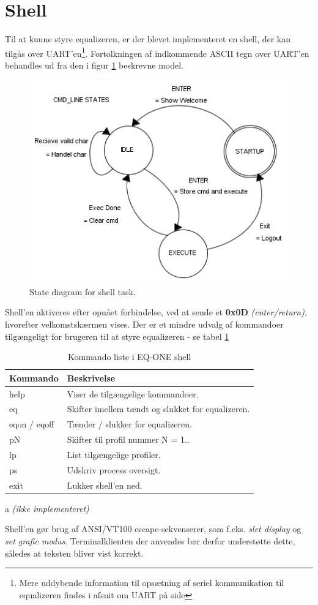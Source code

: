\section{Shell}
Til at kunne styre equalizeren, er der blevet implementeret en shell, der kan tilgås over UART'en\footnote{Mere uddybende information til opsætning af seriel kommunikation til equalizeren findes i afsnit om UART på side \pageref{subsec:uart}}.
Fortolkningen af indkommende ASCII tegn over UART'en behandles ud fra den i figur \ref{fig:shell_task} beskrevne model.
\begin{figure}[h!]
	\centering
	\includegraphics[width=.6\textwidth]{billeder/cmd_states.png}
	\caption{State diagram for shell task.}
	\label{fig:shell_task}
\end{figure}

Shell'en aktiveres efter opnået forbindelse, ved at sende et \textbf{0x0D} \textit{(enter/return)}, hvorefter velkomstskærmen vises.
Der er et mindre udvalg af kommandoer tilgængeligt for brugeren til at styre equalizeren - se tabel \ref{tab:shell_cmd} 

\begin{table}[h!]
	\caption{Kommando liste i EQ-ONE shell}
	\label{tab:shell_cmd}
	\begin{threeparttable}
		\begin{tabular}{l p{}}
			\toprule
			\textbf{Kommando}      & \textbf{Beskrivelse}   \\ 
			\midrule
			help		& Viser de tilgængelige kommandoer. \\
			eq       	& Skifter imellem tændt og slukket for equalizeren. \\
			eqon / eqoff & Tænder / slukker for equalizeren. \tnote{a}\\
			pN			& Skifter til profil nummer N = 1.. \\
			lp			& List tilgængelige profiler.\tnote{a}\\
			ps		    & Udskriv process oversigt. \\
			exit 		& Lukker shell'en ned. \\
			\bottomrule
		\end{tabular}
		
		\begin{tablenotes}
			\item[a] \textit{(ikke implementeret)}
		\end{tablenotes}
	\end{threeparttable}
\end{table}

Shell'en gør brug af ANSI/VT100 escape-sekvenserer, som f.eks. \textit{slet display} og \textit{set grafic modus}.
Terminalklienten der anvendes bør derfor understøtte dette, således at teksten bliver vist korrekt.







